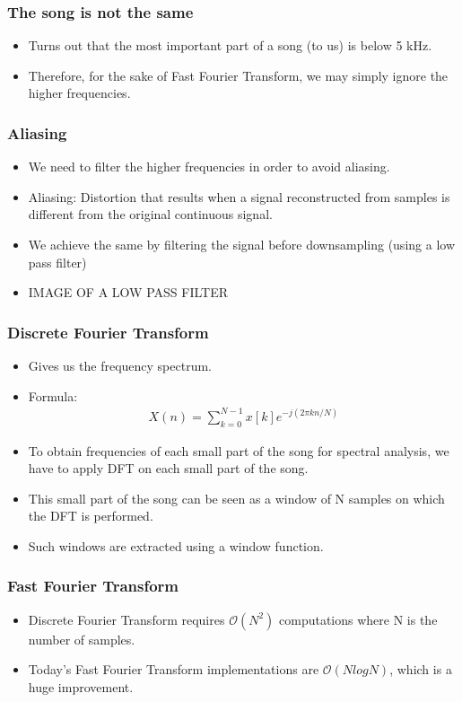 \documentclass{beamer}
\begin{document}
\begin{frame}[t]
    \frametitle{The song is not the same}   
    \begin{itemize}
        \item Turns out that the most important part of a song (to us) is below \alert{5 kHz}.
        \item Therefore, for the sake of Fast Fourier Transform, we may simply ignore the higher frequencies.
    \end{itemize}
\end{frame}
    
\begin{frame}[t]
    \frametitle{Aliasing}   
    \begin{itemize}
        \item We need to filter the higher frequencies in order to avoid aliasing.
        \item \alert{Aliasing}: Distortion that results when a signal reconstructed from samples is different from the original continuous signal.
        \item We achieve the same by filtering the signal before downsampling (using a low pass filter)
        \item IMAGE OF A LOW PASS FILTER
    \end{itemize}
\end{frame}

\begin{frame}[t]
    \frametitle{Discrete Fourier Transform}
    \begin{itemize}
        \item Gives us the frequency spectrum.
        \item Formula: 
            \begin{align*}
                X(n) = \sum_{k=0}^{N-1} x[k] e^{-j(2\pi kn/N)}
            \end{align*}
        \item To obtain frequencies of each small part of the song for spectral analysis, we have to apply DFT on each small part of the song.
        \item This small part of the song can be seen as a window of N samples on which the DFT is performed.
        \item Such windows are extracted using a \alert{window function}.
    \end{itemize}
\end{frame}

\begin{frame}[t]
    \frametitle{Fast Fourier Transform}
    \begin{itemize}
        \item Discrete Fourier Transform requires \(\mathcal{O}(N^2)\) computations where N is the number of samples.
        \item Today's Fast Fourier Transform implementations are \(\mathcal{O}(NlogN)\), which is a huge improvement.
    \end{itemize}
\end{frame}
\end{document}
